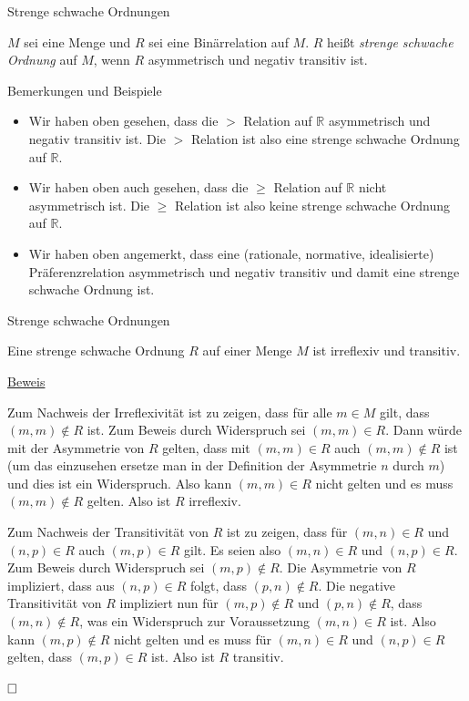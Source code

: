 \documentclass[
  8pt,
  ignorenonframetext,
]{beamer}
\providecommand{\tightlist}{%
  \setlength{\itemsep}{0pt}\setlength{\parskip}{0pt}}
\begin{document}
\begin{frame}{Strenge schwache Ordnungen}
\protect\hypertarget{strenge-schwache-ordnungen-2}{}
\small
\begin{definition}
$M$ sei eine Menge und $R$ sei eine Binärrelation auf $M$. $R$ heißt \textit{strenge schwache Ordnung}
auf $M$, wenn $R$ asymmetrisch und negativ transitiv ist.
\end{definition}
\footnotesize

Bemerkungen und Beispiele

\begin{itemize}
\tightlist
\item
  \justifying Wir haben oben gesehen, dass die \(>\) Relation auf
  \(\mathbb{R}\) asymmetrisch und negativ transitiv ist. Die \(>\)
  Relation ist also eine strenge schwache Ordnung auf \(\mathbb{R}\).
\item
  Wir haben oben auch gesehen, dass die \(\ge\) Relation auf
  \(\mathbb{R}\) nicht asymmetrisch ist. Die \(\ge\) Relation ist also
  keine strenge schwache Ordnung auf \(\mathbb{R}\).
\item
  Wir haben oben angemerkt, dass eine (rationale, normative,
  idealisierte) Präferenzrelation asymmetrisch und negativ transitiv und
  damit eine strenge schwache Ordnung ist.
\end{itemize}
\end{frame}

\begin{frame}{Strenge schwache Ordnungen}
\protect\hypertarget{strenge-schwache-ordnungen-3}{}
\small
\begin{theorem}
\normalfont
Eine strenge schwache Ordnung $R$ auf einer Menge $M$ ist irreflexiv und transitiv.
\end{theorem}

\footnotesize

\underline{Beweis}

Zum Nachweis der Irreflexivität ist zu zeigen, dass für alle \(m \in M\)
gilt, dass \((m,m)\notin R\) ist. Zum Beweis durch Widerspruch sei
\((m,m) \in R\). Dann würde mit der Asymmetrie von \(R\) gelten, dass
mit \((m,m) \in R\) auch \((m,m) \notin R\) ist (um das einzusehen
ersetze man in der Definition der Asymmetrie \(n\) durch \(m\)) und dies
ist ein Widerspruch. Also kann \((m,m) \in R\) nicht gelten und es muss
\((m,m) \notin R\) gelten. Also ist \(R\) irreflexiv.

Zum Nachweis der Transitivität von \(R\) ist zu zeigen, dass für
\((m,n) \in R\) und \((n,p) \in R\) auch \((m,p) \in R\) gilt. Es seien
also \((m,n) \in R\) und \((n,p) \in R\). Zum Beweis durch Widerspruch
sei \((m,p) \notin R\). Die Asymmetrie von \(R\) impliziert, dass aus
\((n,p) \in R\) folgt, dass \((p,n) \notin R\). Die negative
Transitivität von \(R\) impliziert nun für \((m,p) \notin R\) und
\((p,n) \notin R\), dass \((m,n) \notin R\), was ein Widerspruch zur
Voraussetzung \((m,n) \in R\) ist. Also kann \((m,p) \notin R\) nicht
gelten und es muss für \((m,n) \in R\) und \((n,p) \in R\) gelten, dass
\((m,p) \in R\) ist. Also ist \(R\) transitiv.

\(\hfill \Box\)
\end{frame}
\end{document}
